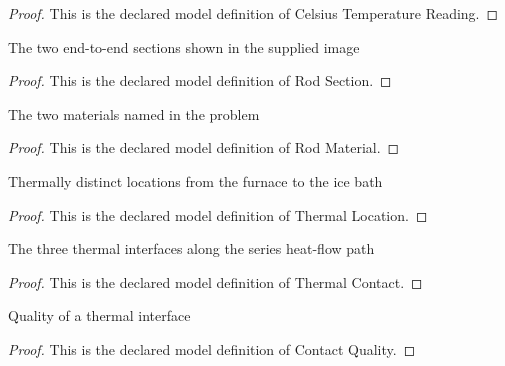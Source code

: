 \begin{proof}
  This is the declared model definition of Celsius Temperature Reading.
\end{proof}
\begin{definition}
  \label{def:physics:phyx-mini-0488:phyxminiproblems-problemphyxmini0488-rodsection}
  The two end-to-end sections shown in the supplied image
\end{definition}
\begin{proof}
  This is the declared model definition of Rod Section.
\end{proof}
\begin{definition}
  \label{def:physics:phyx-mini-0488:phyxminiproblems-problemphyxmini0488-rodmaterial}
  The two materials named in the problem
\end{definition}
\begin{proof}
  This is the declared model definition of Rod Material.
\end{proof}
\begin{definition}
  \label{def:physics:phyx-mini-0488:phyxminiproblems-problemphyxmini0488-thermallocation}
  Thermally distinct locations from the furnace to the ice bath
\end{definition}
\begin{proof}
  This is the declared model definition of Thermal Location.
\end{proof}
\begin{definition}
  \label{def:physics:phyx-mini-0488:phyxminiproblems-problemphyxmini0488-thermalcontact}
  The three thermal interfaces along the series heat-flow path
\end{definition}
\begin{proof}
  This is the declared model definition of Thermal Contact.
\end{proof}
\begin{definition}
  \label{def:physics:phyx-mini-0488:phyxminiproblems-problemphyxmini0488-contactquality}
  Quality of a thermal interface
\end{definition}
\begin{proof}
  This is the declared model definition of Contact Quality.
\end{proof}
